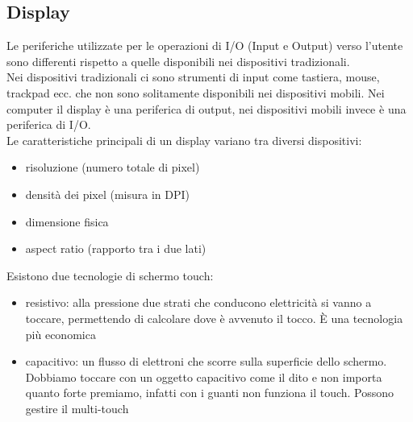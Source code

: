 \subsection{Display}
Le periferiche utilizzate per le operazioni di I/O (Input e Output) verso l’utente sono differenti rispetto a quelle disponibili nei dispositivi tradizionali.
\\ Nei dispositivi tradizionali ci sono strumenti di input come tastiera, mouse, trackpad ecc. che non sono solitamente disponibili nei dispositivi mobili. 
Nei computer il display è una periferica di output, nei dispositivi mobili invece è una periferica di I/O.
\\ Le caratteristiche principali di un display variano tra diversi dispositivi: 
\begin{itemize}
    \item risoluzione (numero totale di pixel)
    \item densità dei pixel (misura in DPI)
    \item dimensione fisica
    \item aspect ratio (rapporto tra i due lati)
\end{itemize}

Esistono due tecnologie di schermo touch:
\begin{itemize}
    \item resistivo: alla pressione due strati che conducono elettricità si vanno a toccare, permettendo di calcolare dove è avvenuto il tocco. È una tecnologia più economica
    \item capacitivo: un flusso di elettroni che scorre sulla superficie dello schermo. Dobbiamo toccare con un oggetto capacitivo come il dito e non importa quanto forte premiamo, infatti con i guanti non funziona il touch. Possono gestire il multi-touch
\end{itemize}

